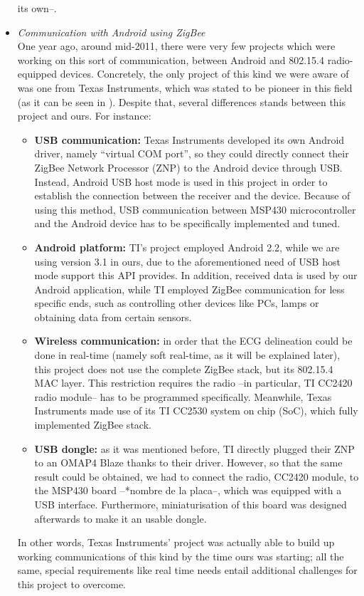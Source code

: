 \begin{itemize}
				its own--.
			\item \emph{Communication with Android using ZigBee}\\
				One year ago, around mid-2011, there were very few projects which were working on this sort of
				communication, between Android and 802.15.4 radio-equipped devices. Concretely, the only project
				of this kind we were aware of was one from Texas Instruments, which was stated to be pioneer in 
				this field (as it can be seen in \cite{articleTI}).
				Despite that, several differences stands between this project and ours. For instance:
				\begin{itemize}
					\item \textbf{USB communication:} Texas Instruments developed its own Android driver, namely
						``virtual COM port'', so they could directly connect their ZigBee Network Processor (ZNP)
						to the Android device through USB. Instead, Android USB host mode is used in this project
						in order to establish the connection between the receiver and the device. Because of
						using this method, USB communication between MSP430 microcontroller and the Android
						device has to be specifically implemented and tuned.
					\item \textbf{Android platform:} TI's project employed Android 2.2, while we are using
						version	3.1 in ours, due to the aforementioned need of USB host mode support this API
						provides. In addition, received data is used by our Android application, while TI
						employed ZigBee communication for less specific ends, such as controlling other devices
						like PCs, lamps or obtaining data from certain sensors.
					\item \textbf{Wireless communication:} in order that the ECG delineation could be done in
						real-time (namely soft real-time, as it will be explained later), this project does not
						use the complete ZigBee stack, but its 802.15.4 MAC layer. This restriction requires the
						radio --in particular, TI CC2420 radio module-- has to be programmed specifically.
						Meanwhile, Texas Instruments made use of its TI CC2530 system on chip (SoC), which fully 
						implemented ZigBee stack.
					\item \textbf{USB dongle:} as it was mentioned before, TI directly plugged their ZNP to an
						OMAP4 Blaze thanks to their driver. However, so that the same result could be obtained,
						we had to connect the radio, CC2420 module, to the MSP430 board --*nombre de la placa--,
						which was equipped with a USB interface. Furthermore, miniaturisation of this board was
						designed afterwards to make it an usable dongle.
				\end{itemize}
				In other words, Texas Instruments' project was actually able to build up working communications
				of this kind by the time ours was starting; all the same, special requirements like real time
				needs entail additional challenges for this project to overcome.
		\end{itemize}
	
